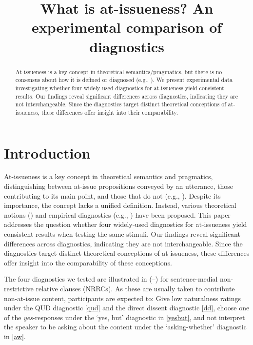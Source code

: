 \documentclass[times,linguex,xcolor]{glossa}
\title[What is at-issueness?]{What is at-issueness? An experimental comparison of diagnostics\\ 
  }
\author[]%
{%
}
\begin{document}
\maketitle


\begin{abstract}
  At-issueness is a key concept in theoretical semantics/pragmatics, but there is no consensus about how it is defined or diagnosed (e.g., \citealt{tonhauser_diagnosing_2012,tonhauser_how_2018,koev_notions_2018}). We present experimental data investigating whether four widely used diagnostics for at-issueness yield consistent results. Our findings reveal significant differences across diagnostics, indicating they are not interchangeable. Since the diagnostics target distinct theoretical conceptions of at-issueness, these differences offer insight into their comparability.

\end{abstract}


\section{Introduction \label{sec:1_introduction}}

  At-issueness is a key concept in theoretical semantics and pragmatics, distinguishing between at-issue propositions conveyed by an utterance, those contributing to its main point, and those that do not (e.g., \citealt{karttunen_conventional_1979,horton_presuppositions_1988,abbott_presuppositions_2000,faller_semantics_2003,potts_logic_2005,tonhauser_diagnosing_2012}). Despite its importance, the concept lacks a unified definition. Instead, various theoretical notions (\citealt{koev_notions_2018,tonhauser_how_2018}) and empirical diagnostics (e.g., \citealt{tonhauser_diagnosing_2012}) have been proposed. This paper addresses the question whether four widely‐used diagnostics for at-issueness yield consistent results when testing the same stimuli. Our findings reveal significant differences across diagnostics, indicating they are not interchangeable. Since the diagnostics target distinct theoretical conceptions of at-issueness, these differences offer insight into the comparability of these conceptions.

  The four diagnostics we tested are illustrated in (--) for sentence-medial non-restrictive relative clauses (NRRCs). As these are usually taken to contribute non-at-issue content, participants are expected to: Give low naturalness ratings under the QUD diagnostic \ref{qud} and the direct dissent diagnostic \ref{dd}, choose one of the \emph{yes}-responses under the `yes, but' diagnostic in \ref{yesbut}, and not interpret the speaker to be asking about the content under the `asking-whether' diagnostic in \ref{aw}.
\end{document}
